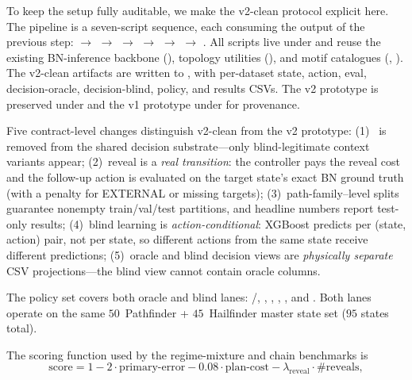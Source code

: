 \documentclass[11pt,openany]{report}
\begin{document}
To keep the setup fully auditable, we make the v2-clean protocol explicit here.
The pipeline is a seven-script sequence, each consuming the output of
the previous step:
$\rightarrow$
$\rightarrow$
$\rightarrow$
$\rightarrow$
$\rightarrow$
$\rightarrow$
.
All scripts live under  and reuse the existing
BN-inference backbone (),
topology utilities (),
and motif catalogues
(,
).
The v2-clean artifacts are written to ,
with per-dataset state, action, eval, decision-oracle, decision-blind,
policy, and results CSVs.
The v2 prototype is preserved under  and
the v1 prototype under  for provenance.
\par
Five contract-level changes distinguish v2-clean from the v2 prototype:
(1)~ is removed from the shared
decision substrate---only blind-legitimate context variants appear;
(2)~reveal is a \emph{real transition}: the controller pays the reveal
cost and the follow-up action is evaluated on the target state's exact
BN ground truth (with a penalty for EXTERNAL or missing targets);
(3)~path-family--level splits guarantee nonempty train/val/test partitions,
and headline numbers report test-only results;
(4)~blind learning is \emph{action-conditional}: XGBoost predicts
per (state, action) pair, not per state, so different actions from the
same state receive different  predictions;
(5)~oracle and blind decision views are \emph{physically separate}
CSV projections---the blind view cannot contain oracle columns.
\par
The policy set covers both oracle and blind lanes:
/,
,
,
,
, and
.
Both lanes operate on the same $50$~Pathfinder +
$45$~Hailfinder master state set ($95$ states total).
\par
The scoring function used by the regime-mixture and chain benchmarks is
\[
\text{score}
=
1
- 2\cdot \text{primary-error}
- 0.08\cdot \text{plan-cost}
- \lambda_{\text{reveal}}\cdot \#\text{reveals},
\]
\end{document}
